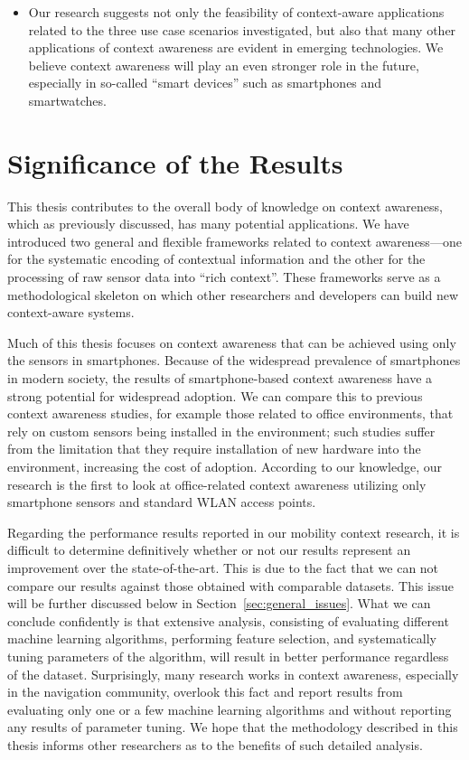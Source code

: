 \begin{itemize}
%
\item Our research suggests not only the feasibility of context-aware applications related to the three use case scenarios investigated, but also that many other applications of context awareness are evident in emerging technologies. We believe context awareness will play an even stronger role in the future, especially in so-called ``smart devices'' such as smartphones and smartwatches.
%
\end{itemize}

\section{Significance of the Results}
\label{sec:significance}

This thesis contributes to the overall body of knowledge on context awareness, which as previously discussed, has many potential applications. We have introduced two general and flexible frameworks related to context awareness---one for the systematic encoding of contextual information and the other for the processing of raw sensor data into ``rich context''. These frameworks serve as a methodological skeleton on which other researchers and developers can build new context-aware systems.

Much of this thesis focuses on context awareness that can be achieved using only the sensors in smartphones. Because of the widespread prevalence of smartphones in modern society, the results of smartphone-based context awareness have a strong potential for widespread adoption. We can compare this to previous context awareness studies, for example those related to office environments, that rely on custom sensors being installed in the environment; such studies suffer from the limitation that they require installation of new hardware into the environment, increasing the cost of adoption. According to our knowledge, our research is the first to look at office-related context awareness utilizing only smartphone sensors and standard WLAN access points.

Regarding the performance results reported in our mobility context research, it is difficult to determine definitively whether or not our results represent an improvement over the state-of-the-art. This is due to the fact that we can not compare our results against those obtained with comparable datasets. This issue will be further discussed below in Section~\ref{sec:general_issues}. What we can conclude confidently is that extensive analysis, consisting of evaluating different machine learning algorithms, performing feature selection, and systematically tuning parameters of the algorithm, will result in better performance regardless of the dataset. Surprisingly, many research works in context awareness, especially in the navigation community, overlook this fact and report results from evaluating only one or a few machine learning algorithms and without reporting any results of parameter tuning. We hope that the methodology described in this thesis informs other researchers as to the benefits of such detailed analysis.


